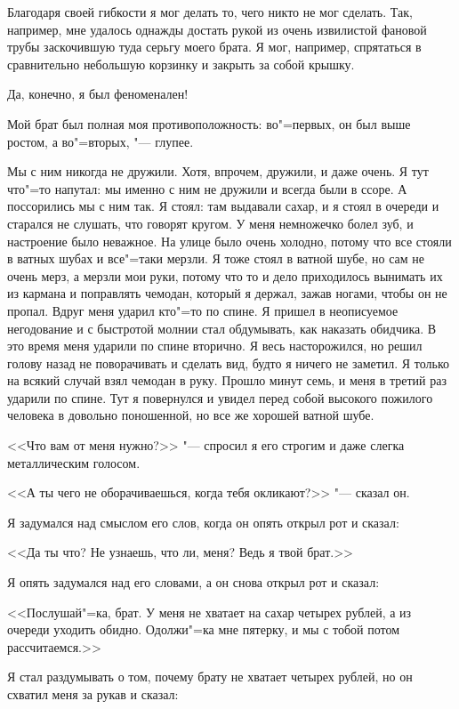 Благодаря своей гибкости я мог делать то, чего никто не мог сделать. Так, 
например, мне удалось однажды достать рукой из очень извилистой фановой 
трубы заскочившую туда серьгу моего брата. Я мог, например, спрятаться в 
сравнительно небольшую корзинку и закрыть за собой крышку.

Да, конечно, я был феноменален!

Мой брат был полная моя противоположность: во"=первых, он был выше ростом, 
а во"=вторых, "--- глупее.

Мы с ним никогда не дружили. Хотя, впрочем, дружили, и даже очень. Я тут 
что"=то напутал: мы именно с ним не дружили и всегда были в ссоре. А 
поссорились мы с ним так. Я стоял: там выдавали сахар, и я стоял в очереди 
и старался не слушать, что говорят кругом. У меня немножечко болел зуб, и 
настроение было неважное. На улице было очень холодно, потому что все 
стояли в ватных шубах и все"=таки мерзли. Я тоже стоял в ватной шубе, но 
сам не очень мерз, а мерзли мои руки, потому что то и дело приходилось 
вынимать их из кармана и поправлять чемодан, который я держал, зажав 
ногами, чтобы он не пропал. Вдруг меня ударил кто"=то по спине. Я пришел в 
неописуемое негодование и с быстротой молнии стал обдумывать, как наказать 
обидчика. В это время меня ударили по спине вторично. Я весь насторожился, 
но решил голову назад не поворачивать и сделать вид, будто я ничего не 
заметил. Я только на всякий случай взял чемодан в руку. Прошло минут семь, 
и меня в третий раз ударили по спине. Тут я повернулся и увидел перед 
собой высокого пожилого человека в довольно поношенной, но все же хорошей 
ватной шубе.

<<Что вам от меня нужно?>> "--- спросил я его строгим и даже слегка 
металлическим голосом.

<<А ты чего не оборачиваешься, когда тебя окликают?>> "--- сказал он.

Я задумался над смыслом его слов, когда он опять открыл рот и сказал:

<<Да ты что? Не узнаешь, что ли, меня? Ведь я твой брат.>>

Я опять задумался над его словами, а он снова открыл рот и сказал:

<<Послушай"=ка, брат. У меня не хватает на сахар четырех рублей, а из 
очереди уходить обидно. Одолжи"=ка мне пятерку, и мы с тобой потом 
рассчитаемся.>>

Я стал раздумывать о том, почему брату не хватает четырех рублей, но он 
схватил меня за рукав и сказал:

